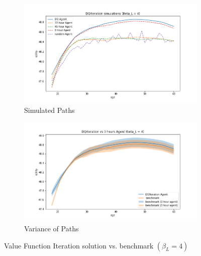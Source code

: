 \begin{figure}[ht]
\begin{subfigure}{.5\textwidth}
  \centering
  \includegraphics[width=1\linewidth]{figures/dqi_model1_beta_4_solution_benchmark_paths.png}
  \caption{Simulated Paths}
  \label{fig:dqi_solution_beta4_path}
\end{subfigure}%
\begin{subfigure}{.5\textwidth}
  \centering
  \includegraphics[width=1\linewidth]{figures/dqi_model1_beta_4_solution_benchmark_variance.png}
  \caption{Variance of Paths}
  \label{fig:dqi_solution_beta4_var}
\end{subfigure}
    \caption{Value Function Iteration solution vs. benchmark $(\beta_L = 4)$}
    \label{fig:dqi_solution_beta4}
\end{figure}

